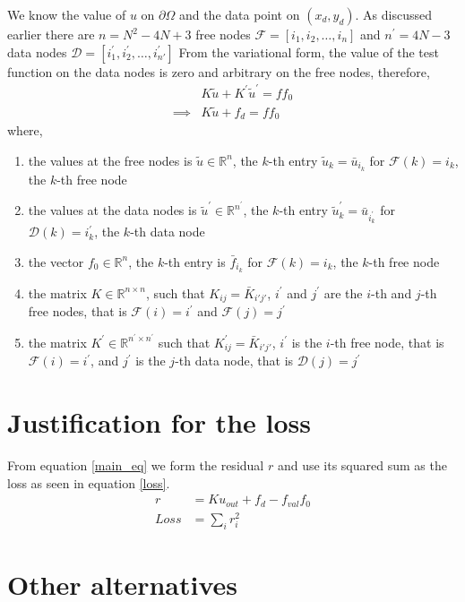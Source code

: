 \documentclass{article}
\begin{document}
We know the value of $u$
on $\partial \Omega$ and the data point on $(x_d,y_d)$.
As discussed earlier there are $n = N^2- 4N + 3$ free nodes
$\mathcal{F} = [i_1, i_2, \dots, i_n]$
and $n^\prime = 4N - 3$ data nodes
$\mathcal{D} = [i_1^\prime, i_2^\prime, \dots, i_{n'}^\prime]$
From the variational form,
the value of the test function on the data nodes is zero
and arbitrary on the free nodes,
therefore,
\begin{align}
	& K \tilde{u} + K^\prime \tilde{u}^\prime = f f_0 \\
	\implies 
	& K \tilde{u} + f_d = f f_0 \label{main_eq}
\end{align}
where,
\begin{enumerate}
	\item the values at the free nodes is $\tilde{u} \in \mathbb{R}^n$,
		the $k$-th entry
		$\tilde{u}_k = \bar{u}_{i_k}$ for $\mathcal{F}(k) = i_k$, the $k$-th free node
	\item the values at the data nodes is $\tilde{u}^\prime \in \mathbb{R}^{n^\prime}$,
		the $k$-th entry
		$\tilde{u}_k^\prime = \bar{u}_{i_k^\prime}$ for $\mathcal{D}(k) = i_k^\prime$, the $k$-th data node
	\item the vector $f_0 \in \mathbb{R}^n$,
		the $k$-th entry is $\bar{f}_{i_k}$ for $\mathcal{F}(k) = i_k$, the $k$-th free node
	\item the matrix $K \in \mathbb{R}^{n \times n}$,
		such that $K_{ij} = \bar{K}_{i' j'}$,
		$i^\prime$ and $j^\prime$ are the $i$-th and $j$-th free nodes,
		that is $\mathcal{F}(i) = i^\prime$
		and $\mathcal{F}(j) = j^\prime$
	\item the matrix $K^\prime \in \mathbb{R}^{n^\prime \times n^\prime}$
		such that $K_{ij}^\prime = \bar{K}_{i' j'}$,
		$i^\prime$ is the $i$-th free node,
		that is $\mathcal{F}(i) = i^\prime$,
		and $j^\prime$ is the $j$-th data node,
		that is $\mathcal{D}(j) = j^\prime$
\end{enumerate}

\section{Justification for the loss}

From equation \ref{main_eq} we form the residual $r$
and use its squared sum as the loss as seen in equation \ref{loss}.
\begin{align*}
	r &= K u_{\mathit{out}} + f_d - f_{\mathit{val}} f_0 \\
	\mathit{Loss} &= \sum_i r_i^2 \label{loss}
\end{align*}

\section{Other alternatives}
\end{document}
